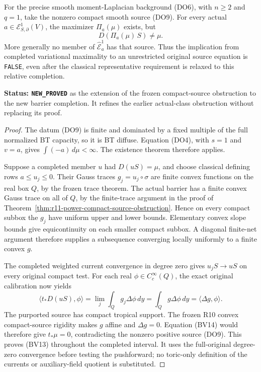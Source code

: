 \begin{proposition}
\label{prop:r11-completed-maximizer-source-obstruction}
For the precise smooth moment-Laplacian background
(DO6), with $n\geq2$ and $q=1$, take the
nonzero compact smooth source (DO9).
For every actual
$a\in\mathcal E^1_{S,\partial}(V)$, the
maximizer $\Pi_a(\mu)$ exists, but
\[
                            D(\Pi_a(\mu)\,S)\ne\mu .
 \tag{BV13}
\]
More generally no member of
$\widehat{\mathcal E}^1_a$ has that source.
Thus the implication from completed variational
maximality to an unrestricted original source
equation is \texttt{FALSE}, even after the
classical representative requirement is relaxed
to this relative completion.
\end{proposition}

\noindent\textbf{Status: \texttt{NEW\_PROVED}}
as the extension of the frozen compact-source
obstruction to the new barrier completion.
It refines the earlier actual-class obstruction
without replacing its proof.

\begin{proof}
The datum (DO9) is finite and dominated by a
fixed multiple of the full normalized BT
capacity, so it is BT diffuse.
Equation (DO4), with $s=1$ and $v=a$,
gives $\int(-a)\,d\mu<\infty$.
The existence theorem therefore applies.

Suppose a completed member $u$ had
$D(uS)=\mu$, and choose classical defining
rows $a\leq u_j\leq0$.
Their Gauss traces $g_j=u_j\circ\sigma$
are finite convex functions on the real
box $Q$, by the frozen trace theorem.
The actual barrier has a finite convex
Gauss trace on all of $Q$, by the
finite-trace argument in the proof of
Theorem~\ref{thm:r11-power-compact-source-obstruction}.
Hence on every compact subbox the $g_j$
have uniform upper and lower bounds.
Elementary convex slope bounds give
equicontinuity on each smaller compact
subbox.  A diagonal finite-net argument
therefore supplies a subsequence converging
locally uniformly to a finite convex $g$.

The completed weighted current convergence
in degree zero gives $u_jS\to uS$ on
every original compact test.
For each real $\phi\in C_c^\infty(Q)$,
the exact original calibration now yields
\[
 \langle t_*D(uS),\phi\rangle
     =\lim_j\int_Q g_j\Delta\phi\,dy
     =\int_Q g\Delta\phi\,dy
     =\langle\Delta g,\phi\rangle.
 \tag{BV14}
\]
The purported source has compact tropical
support.  The frozen R10 convex compact-source
rigidity makes $g$ affine and $\Delta g=0$.
Equation (BV14) would therefore give
$t_*\mu=0$, contradicting the nonzero
positive source (DO9).
This proves (BV13) throughout the completed
interval.
It uses the full-original degree-zero
convergence before testing the pushforward;
no toric-only definition of the currents
or auxiliary-field quotient is substituted.
\end{proof}

